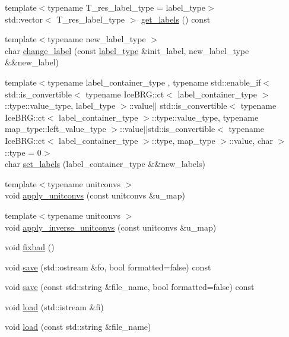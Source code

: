 \begin{DoxyCompactItemize}
\item 
{\footnotesize template$<$typename T\+\_\+res\+\_\+label\+\_\+type  = label\+\_\+type$>$ }\\std\+::vector$<$ T\+\_\+res\+\_\+label\+\_\+type $>$ \hyperlink{classIceBRG_1_1labeled__array_a0fa88e0a53141a60ace18cd1e4bd8283}{get\+\_\+labels} () const 
\item 
{\footnotesize template$<$typename new\+\_\+label\+\_\+type $>$ }\\char \hyperlink{classIceBRG_1_1labeled__array_af9c07104255691cc706834c8d3b78f08}{change\+\_\+label} (const \hyperlink{classIceBRG_1_1labeled__array_a6355a8e274be241162cfe4717bcd907f}{label\+\_\+type} \&init\+\_\+label, new\+\_\+label\+\_\+type \&\&new\+\_\+label)
\item 
{\footnotesize template$<$typename label\+\_\+container\+\_\+type , typename std\+::enable\+\_\+if$<$ std\+::is\+\_\+convertible$<$ typename Ice\+B\+R\+G\+::ct$<$ label\+\_\+container\+\_\+type $>$\+::type\+::value\+\_\+type, label\+\_\+type $>$\+::value$\vert$$\vert$                                                       std\+::is\+\_\+convertible$<$ typename Ice\+B\+R\+G\+::ct$<$ label\+\_\+container\+\_\+type $>$\+::type\+::value\+\_\+type, typename map\+\_\+type\+::left\+\_\+value\+\_\+type $>$\+::value$\vert$$\vert$std\+::is\+\_\+convertible$<$ typename Ice\+B\+R\+G\+::ct$<$ label\+\_\+container\+\_\+type $>$\+::type, map\+\_\+type $>$\+::value, char $>$\+::type  = 0$>$ }\\char \hyperlink{classIceBRG_1_1labeled__array_a8b6d041e7382eb8f7f4f393450e0812f}{set\+\_\+labels} (label\+\_\+container\+\_\+type \&\&new\+\_\+labels)
\item 
{\footnotesize template$<$typename unitconvs $>$ }\\void \hyperlink{classIceBRG_1_1labeled__array_ac72d3dc4024e71a637eaed2b4f8e70fc}{apply\+\_\+unitconvs} (const unitconvs \&u\+\_\+map)
\item 
{\footnotesize template$<$typename unitconvs $>$ }\\void \hyperlink{classIceBRG_1_1labeled__array_aea737a97db861dfa63edb911369cea22}{apply\+\_\+inverse\+\_\+unitconvs} (const unitconvs \&u\+\_\+map)
\item 
void \hyperlink{classIceBRG_1_1labeled__array_ad6941ad55d70de5b74a80f7805d34b0d}{fixbad} ()
\item 
void \hyperlink{classIceBRG_1_1labeled__array_ae2c89a1de931fe6c503941e81db8c809}{save} (std\+::ostream \&fo, bool formatted=false) const 
\item 
void \hyperlink{classIceBRG_1_1labeled__array_a6aeff6d6aa966a7a57ae5297e248a447}{save} (const std\+::string \&file\+\_\+name, bool formatted=false) const 
\item 
void \hyperlink{classIceBRG_1_1labeled__array_a41be1863e25c56ea0674df40bd90d7b8}{load} (std\+::istream \&fi)
\item 
void \hyperlink{classIceBRG_1_1labeled__array_a4517ebc01641c579ab1aa7aba026a96a}{load} (const std\+::string \&file\+\_\+name)
\end{DoxyCompactItemize}
